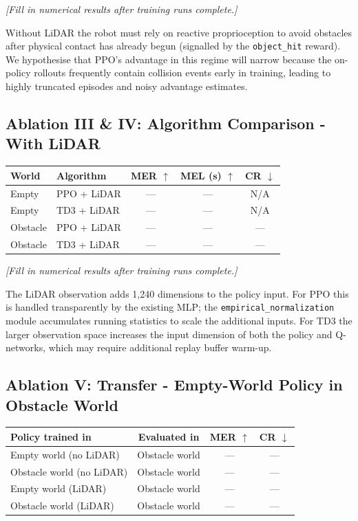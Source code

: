 \documentclass{article}
\begin{document}
\textit{[Fill in numerical results after training runs complete.]}

Without LiDAR the robot must rely on reactive proprioception to avoid
obstacles after physical contact has already begun (signalled by the
\texttt{object\_hit} reward).
We hypothesise that PPO's advantage in this regime will narrow because the
on-policy rollouts frequently contain collision events early in training,
leading to highly truncated episodes and noisy advantage estimates.

\subsection{Ablation III \& IV: Algorithm Comparison - With LiDAR}

\begin{center}
\begin{tabular}{llccc}
  \toprule
  \textbf{World} & \textbf{Algorithm} & \textbf{MER} $\uparrow$
    & \textbf{MEL (s)} $\uparrow$ & \textbf{CR} $\downarrow$ \\
  \midrule
  Empty    & PPO + LiDAR & --- & --- & N/A \\
  Empty    & TD3 + LiDAR & --- & --- & N/A \\
  Obstacle & PPO + LiDAR & --- & --- & --- \\
  Obstacle & TD3 + LiDAR & --- & --- & --- \\
  \bottomrule
\end{tabular}
\end{center}

\textit{[Fill in numerical results after training runs complete.]}

The LiDAR observation adds 1{,}240 dimensions to the policy input.
For PPO this is handled transparently by the existing MLP; the
\texttt{empirical\_normalization} module accumulates running statistics to
scale the additional inputs.
For TD3 the larger observation space increases the input dimension of both
the policy and Q-networks, which may require additional replay buffer
warm-up.

\subsection{Ablation V: Transfer - Empty-World Policy in Obstacle World}

\begin{center}
\begin{tabular}{lccc}
  \toprule
  \textbf{Policy trained in} & \textbf{Evaluated in} & \textbf{MER} $\uparrow$
    & \textbf{CR} $\downarrow$ \\
  \midrule
  Empty world (no LiDAR) & Obstacle world & --- & --- \\
  Obstacle world (no LiDAR) & Obstacle world & --- & --- \\
  Empty world (LiDAR) & Obstacle world & --- & --- \\
  Obstacle world (LiDAR) & Obstacle world & --- & --- \\
  \bottomrule
\end{tabular}
\end{center}
\end{document}
